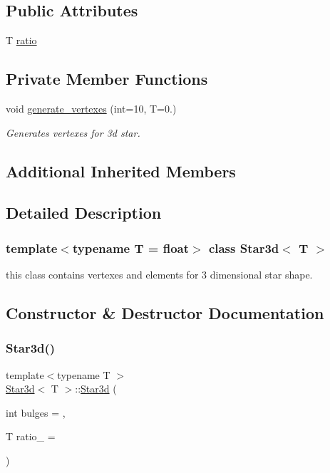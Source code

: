 \subsection*{Public Attributes}
\begin{DoxyCompactItemize}
\item 
T \mbox{\hyperlink{classStar3d_a4c2be78d1baa7a423885cc3574591848}{ratio}}
\end{DoxyCompactItemize}
\subsection*{Private Member Functions}
\begin{DoxyCompactItemize}
\item 
void \mbox{\hyperlink{classStar3d_a43617f398a59d73eb85df49539f9efa5}{generate\+\_\+vertexes}} (int=10, T=0.)
\begin{DoxyCompactList}\small\item\em Generates vertexes for 3d star. \end{DoxyCompactList}\end{DoxyCompactItemize}
\subsection*{Additional Inherited Members}


\subsection{Detailed Description}
\subsubsection*{template$<$typename T = float$>$\newline
class Star3d$<$ T $>$}

this class contains vertexes and elements for 3 dimensional star shape. 

\subsection{Constructor \& Destructor Documentation}
\mbox{\label{classStar3d_ad264da858df1ef77144a4cd7345185da}} 
\subsubsection{\texorpdfstring{Star3d()}{Star3d()}\hspace{0.1cm}{\footnotesize\ttfamily [1/3]}}
{\footnotesize\ttfamily template$<$typename T $>$ \\
\mbox{\hyperlink{classStar3d}{Star3d}}$<$ T $>$\+::\mbox{\hyperlink{classStar3d}{Star3d}} (\begin{DoxyParamCaption}\item[{int}]{bulges = {},  }\item[{T}]{ratio\+\_\+ = {} }\end{DoxyParamCaption})}

